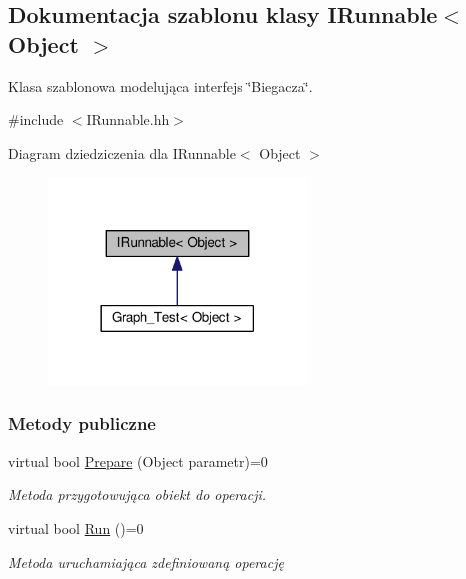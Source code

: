 \hypertarget{class_i_runnable}{\subsection{Dokumentacja szablonu klasy I\-Runnable$<$ Object $>$}
\label{class_i_runnable}
}


Klasa szablonowa modelująca interfejs \char`\"{}\-Biegacza\char`\"{}.  




{\ttfamily \#include $<$I\-Runnable.\-hh$>$}



Diagram dziedziczenia dla I\-Runnable$<$ Object $>$
\nopagebreak
\begin{figure}[H]
\begin{center}
\leavevmode
\includegraphics[width=194pt]{class_i_runnable__inherit__graph}
\end{center}
\end{figure}
\subsubsection*{Metody publiczne}
\begin{DoxyCompactItemize}
\item 
virtual bool \hyperlink{class_i_runnable_a25fb85d8692bfedad61b81f875c6e358}{Prepare} (Object parametr)=0
\begin{DoxyCompactList}\small\item\em Metoda przygotowująca obiekt do operacji. \end{DoxyCompactList}\item 
virtual bool \hyperlink{class_i_runnable_aff6851ded59d477d30c2ef01664b25fe}{Run} ()=0
\begin{DoxyCompactList}\small\item\em Metoda uruchamiająca zdefiniowaną operację \end{DoxyCompactList}\end{DoxyCompactItemize}


